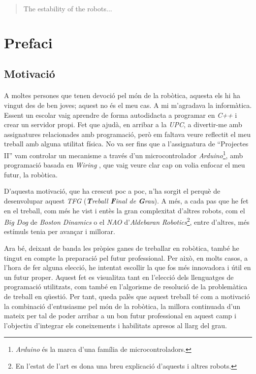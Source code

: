 \documentclass[12pt,a4paper,final,twoside]{article}
\begin{document}
\renewcommand{\abstractname}{Abstract}
\begin{abstract}
The estability of the robots...
\end{abstract}
\newpage
\cleardoublepage

\tableofcontents
\newpage
\listoffigures
\newpage
\listoftables
\newpage



\section*{Prefaci}
\label{Prefaci}


\subsection*{Motivació}
\label{Motivacio}

\paragraph{}A moltes persones que tenen devoció pel món de la robòtica, aquesta els hi ha vingut des de ben joves; aquest no és el meu cas. A mi m'agradava la informàtica. Essent un escolar vaig aprendre de forma autodidacta a programar en \textit{C++} i crear un servidor propi. Fet que ajudà, en arribar a la \textit{UPC}, a divertir-me amb assignatures relacionades amb programació, però em faltava veure reflectit el meu treball amb alguna utilitat física. No va ser fins que a l'assignatura de ``Projectes II'' vam controlar un mecanisme a través d'un microcontrolador \textit{Arduino}\footnote{\textit{Arduino} és la marca d'una família de microcontroladors.}, amb programació basada en \textit{Wiring} \cite{Arduino}, que vaig veure clar cap on volia enfocar el meu futur, la robòtica.

D'aquesta motivació, que ha crescut poc a poc, n'ha sorgit el perquè de desenvolupar aquest \textit{TFG} (\textit{\textbf{T}reball \textbf{F}inal de \textbf{G}rau}). A més, a cada pas que he fet en el treball, com més he vist i entès la gran complexitat d'altres robots, com el \textit{Big Dog} de \textit{Boston Dinamics} o el \textit{NAO} d'\textit{Aldebaran Robotics}\footnote{En l'estat de l'art es dona una breu explicació d'aquests i altres robots.}, entre d'altres, més estímuls tenia per avançar i millorar.

Ara bé, deixant de banda les pròpies ganes de treballar en robòtica, també he tingut en compte la preparació pel futur professional. Per això, en molts casos, a l'hora de fer alguna elecció, he intentat escollir la que fos més innovadora i útil en un futur proper. Aquest fet es visualitza tant en l'elecció dels llenguatges de programació utilitzats, com també en l'algorisme de resolució de la problemàtica de treball en qüestió. Per tant, queda palès que aquest treball té com a motivació la combinació d'entusiasme pel món de la robòtica, la millora continuada d'un mateix per tal de poder arribar a un bon futur professional en aquest camp i l'objectiu d'integrar els coneixements i habilitats apresos al llarg del grau.
\end{document}
